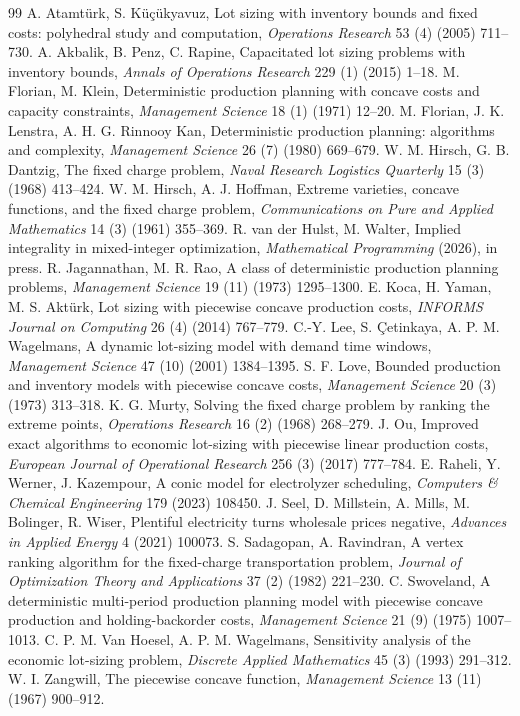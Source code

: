 \documentclass[review,11pt]{elsarticle}
\theoremstyle{remark}
\theoremstyle{definition}
\begin{document}
\begin{thebibliography}{99}
 A. Atamt\"urk, S. K\"u\c{c}\"ukyavuz, Lot sizing with inventory bounds and
fixed costs: polyhedral study and computation, \emph{Operations Research} 53 (4) (2005)
711--730.
 A. Akbalik, B. Penz, C. Rapine, Capacitated lot sizing problems with
inventory bounds, \emph{Annals of Operations Research} 229 (1) (2015) 1--18.
 M. Florian, M. Klein, Deterministic production planning with concave costs
and capacity constraints, \emph{Management Science} 18 (1) (1971) 12--20.
 M. Florian, J. K. Lenstra, A. H. G. Rinnooy Kan, Deterministic production
planning: algorithms and complexity, \emph{Management Science} 26 (7) (1980) 669--679.
 W. M. Hirsch, G. B. Dantzig, The fixed charge problem, \emph{Naval
Research Logistics Quarterly} 15 (3) (1968) 413--424.
 W. M. Hirsch, A. J. Hoffman, Extreme varieties, concave functions, and
the fixed charge problem, \emph{Communications on Pure and Applied Mathematics} 14 (3)
(1961) 355--369.
 R. van der Hulst, M. Walter, Implied integrality in mixed-integer
optimization, \emph{Mathematical Programming} (2026), in press.
 R. Jagannathan, M. R. Rao, A class of deterministic production planning
problems, \emph{Management Science} 19 (11) (1973) 1295--1300.
 E. Koca, H. Yaman, M. S. Akt\"urk, Lot sizing with piecewise concave
production costs, \emph{INFORMS Journal on Computing} 26 (4) (2014) 767--779.
 C.-Y. Lee, S. \c{C}etinkaya, A. P. M. Wagelmans, A dynamic lot-sizing
model with demand time windows, \emph{Management Science} 47 (10) (2001) 1384--1395.
 S. F. Love, Bounded production and inventory models with piecewise
concave costs, \emph{Management Science} 20 (3) (1973) 313--318.
 K. G. Murty, Solving the fixed charge problem by ranking the extreme
points, \emph{Operations Research} 16 (2) (1968) 268--279.
 J. Ou, Improved exact algorithms to economic lot-sizing with piecewise
linear production costs, \emph{European Journal of Operational Research} 256 (3) (2017)
777--784.
 E. Raheli, Y. Werner, J. Kazempour, A conic model for electrolyzer
scheduling, \emph{Computers \& Chemical Engineering} 179 (2023) 108450.
 J. Seel, D. Millstein, A. Mills, M. Bolinger, R. Wiser, Plentiful
electricity turns wholesale prices negative, \emph{Advances in Applied Energy} 4 (2021)
100073.
 S. Sadagopan, A. Ravindran, A vertex ranking algorithm for the
fixed-charge transportation problem, \emph{Journal of Optimization Theory and
Applications} 37 (2) (1982) 221--230.
 C. Swoveland, A deterministic multi-period production planning
model with piecewise concave production and holding-backorder costs, \emph{Management
Science} 21 (9) (1975) 1007--1013.
 C. P. M. Van Hoesel, A. P. M. Wagelmans, Sensitivity analysis of the
economic lot-sizing problem, \emph{Discrete Applied Mathematics} 45 (3) (1993) 291--312.
 W. I. Zangwill, The piecewise concave function, \emph{Management
Science} 13 (11) (1967) 900--912.
\end{thebibliography}
\end{document}
